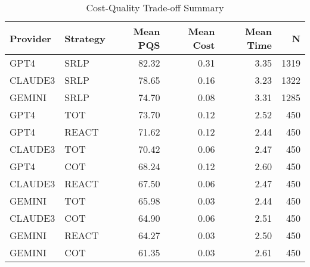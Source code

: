 \begin{table}[htbp]
\centering
\caption{Cost-Quality Trade-off Summary}
\label{tab:cost_quality}
\begin{tabular}{llrrrr}
\toprule
Provider & Strategy & Mean PQS & Mean Cost & Mean Time & N \\
\midrule
GPT4 & SRLP & 82.32 & 0.31 & 3.35 & 1319 \\
CLAUDE3 & SRLP & 78.65 & 0.16 & 3.23 & 1322 \\
GEMINI & SRLP & 74.70 & 0.08 & 3.31 & 1285 \\
GPT4 & TOT & 73.70 & 0.12 & 2.52 & 450 \\
GPT4 & REACT & 71.62 & 0.12 & 2.44 & 450 \\
CLAUDE3 & TOT & 70.42 & 0.06 & 2.47 & 450 \\
GPT4 & COT & 68.24 & 0.12 & 2.60 & 450 \\
CLAUDE3 & REACT & 67.50 & 0.06 & 2.47 & 450 \\
GEMINI & TOT & 65.98 & 0.03 & 2.44 & 450 \\
CLAUDE3 & COT & 64.90 & 0.06 & 2.51 & 450 \\
GEMINI & REACT & 64.27 & 0.03 & 2.50 & 450 \\
GEMINI & COT & 61.35 & 0.03 & 2.61 & 450 \\
\bottomrule
\end{tabular}
\end{table}